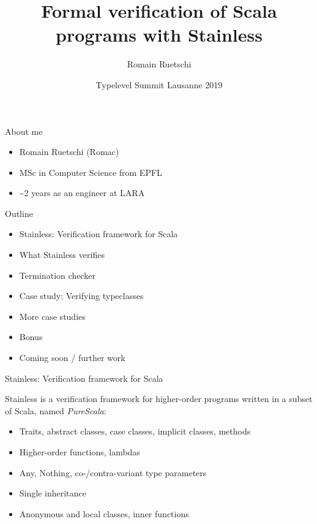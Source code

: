 \documentclass[
  ignorenonframetext,
]{beamer}
\institute{LARA, EPFL}
\title{Formal verification of Scala programs with Stainless}
\author{Romain Ruetschi}
\date{Typelevel Summit Lausanne 2019}
\providecommand{\tightlist}{%
  \setlength{\itemsep}{0pt}\setlength{\parskip}{0pt}}
\begin{document}
\frame{\titlepage}

\begin{frame}{About me}
\protect\hypertarget{about-me}{}

\begin{itemize}
\tightlist
\item
  Romain Ruetschi (Romac)
\item
  MSc in Computer Science from EPFL
\item
  \textasciitilde2 years as an engineer at LARA
\end{itemize}

\end{frame}

\begin{frame}{Outline}
\protect\hypertarget{outline}{}

\begin{itemize}
\tightlist
\item
  Stainless: Verification framework for Scala
\item
  What Stainless verifies
\item
  Termination checker
\item
  Case study: Verifying typeclasses
\item
  More case studies
\item
  Bonus
\item
  Coming soon / further work
\end{itemize}

\end{frame}

\begin{frame}{Stainless: Verification framework for Scala}
\protect\hypertarget{stainless-verification-framework-for-scala}{}

Stainless is a verification framework for higher-order programs written
in a subset of Scala, named \emph{PureScala}:

\begin{itemize}
\tightlist
\item
  Traits, abstract classes, case classes, implicit classes, methods
\item
  Higher-order functions, lambdas
\item
  Any, Nothing, co-/contra-variant type parameters
\item
  Single inheritance
\item
  Anonymous and local classes, inner functions
\end{itemize}

\end{frame}
\end{document}
